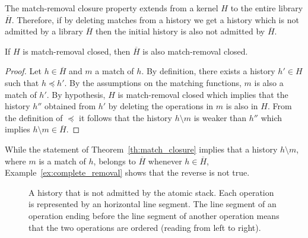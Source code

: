 %
%

The match-removal closure property extends from a kernel $H$ to the entire library $\overline{H}$.
Therefore, if by deleting matches from a history we get a history which is not admitted
by a library $\overline{H}$ then the initial history is also not admitted by $\overline{H}$.

\begin{theorem}\label{th:match_closure}

If $H$ is match-removal closed, then $\overline{H}$ is also match-removal closed.

\end{theorem}

\begin{proof}

Let $h\in \overline{H}$ and $m$ a match of $h$.
By definition, %
there exists a history $h'\in H$ such that $h\preceq h'$. 
By the assumptions on the matching functions, 
$m$ is also a match of $h'$.
By hypothesis, $H$ is match-removal closed which implies 
that the history $h''$ obtained from $h'$ by deleting the operations in $m$ 
is also in $H$. From the definition of $\preceq$ it follows that
the history $h\setminus m$ 
is weaker than $h''$ which implies $h\setminus m\in \overline{H}$.
\end{proof}

While the statement of Theorem~\ref{th:match_closure} implies that a history
$h\setminus m$, where $m$ is a match of $h$, belongs to $\overline{H}$ whenever $h\in \overline{H}$,
Example~\ref{ex:complete_removal} shows that the reverse is not true. 

\begin{figure}



\caption{A history that is not admitted by the atomic stack. Each operation is represented
by an horizontal line segment. The line segment of an operation ending before
the line segment of another operation means that the two operations are ordered
(reading from left to right).
}
\label{fig:complete_removal}

\end{figure}

